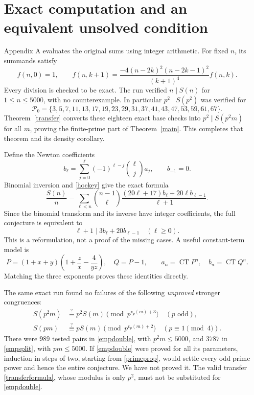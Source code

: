 \documentclass[11pt,a4paper]{article}
\theoremstyle{remark}\newtheorem{remark}[theorem]{Remark}
\newcommand{\CT}{\operatorname{CT}}
\begin{document}
\section{Exact computation and an equivalent unsolved condition}

Appendix A evaluates the original sums using integer arithmetic.
For fixed \(n\), its summands satisfy
\begin{equation}\label{termrec}
 f(n,0)=1,\qquad
 f(n,k+1)=
 \frac{-4(n-2k)^2(n-2k-1)^2}{(k+1)^4}f(n,k).
\end{equation}
Every division is checked to be exact. The run verified
\(n\mid S(n)\) for \(1\le n\le5000\), with no counterexample.
In particular \(p^2\mid S(p^2)\) was verified for
\[
 \mathcal P_0=\{3,5,7,11,13,17,19,23,29,31,37,41,43,47,53,59,61,67\}.
\]
Theorem~\ref{transfer} converts these eighteen exact base checks into
\(p^2\mid S(p^2m)\) for all \(m\), proving the finite-prime part of
Theorem~\ref{main}. This completes that theorem and its density corollary.

Define the Newton coefficients
\[
 b_\ell=\sum_{j=0}^{\ell}(-1)^{\ell-j}\binom{\ell}j a_j,\qquad b_{-1}=0.
\]
Binomial inversion and \eqref{hockey} give the exact formula
\begin{equation}\label{newton}
 \frac{S(n)}n=\sum_{\ell<n}\binom{n-1}{\ell}
 \frac{(20\ell+17)b_\ell+20\ell b_{\ell-1}}{\ell+1}.
\end{equation}
Since the binomial transform and its inverse have integer coefficients,
the full conjecture is equivalent to
\begin{equation}\label{equivalent}
                \ell+1\mid3b_\ell+20b_{\ell-1}\quad(\ell\ge0).
\end{equation}
This is a reformulation, not a proof of the missing cases.
A useful constant-term model is
\[
 P=(1+x+y)\left(1+\frac zx-\frac4{yz}\right),\quad Q=P-1,
 \qquad a_n=\CT P^n,\quad b_n=\CT Q^n.
\]
Matching the three exponents proves these identities directly.

The same exact run found no failures of the following \emph{unproved}
stronger congruences:
\begin{align}
 S(p^2m)&\stackrel{?}{\equiv}p^2S(m)
       \pmod {p^{v_p(m)+3}}\quad(p\text{ odd}),\label{empdouble}\\
 S(pm)&\stackrel{?}{\equiv}pS(m)
       \pmod {p^{v_p(m)+2}}\quad(p\equiv1\pmod4).\label{empsplit}
\end{align}
There were \(989\) tested pairs in \eqref{empdouble}, with \(p^2m\le5000\),
and \(3787\) in \eqref{empsplit}, with \(pm\le5000\).
If \eqref{empdouble} were proved for all its parameters, induction in
steps of two, starting from \eqref{primeprop}, would settle every odd
prime power and hence the entire conjecture. We have not proved it.
The valid transfer \eqref{transferformula}, whose modulus is only \(p^2\),
must not be substituted for \eqref{empdouble}.
\end{document}

